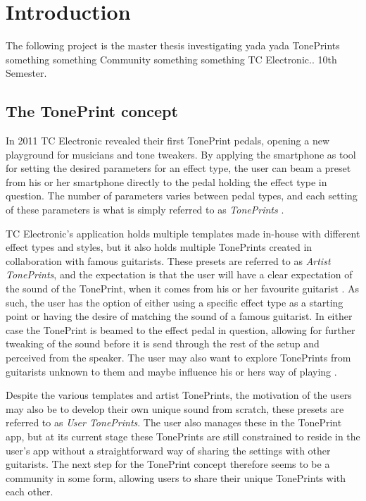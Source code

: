\chapter{Introduction}
\label{Introduction}
The following project is the master thesis investigating yada yada TonePrints something something Community something something TC Electronic.. 10th Semester.

\section{The TonePrint concept}
\label{TonePrints}
In 2011 TC Electronic revealed their first TonePrint pedals, opening a new playground for musicians and tone tweakers. By applying the smartphone as tool for setting the desired parameters for an effect type, the user can beam a preset from his or her smartphone directly to the pedal holding the effect type in question. The number of parameters varies between pedal types, and each setting of these parameters is what is simply referred to as \textit{TonePrints} \parencite{WEB:AboutTonePrints}.

TC Electronic's application holds multiple templates made in-house with different effect types and styles, but it also holds multiple TonePrints created in collaboration with famous guitarists. These presets are referred to as \textit{Artist TonePrints}, and the expectation is that the user will have a clear expectation of the sound of the TonePrint, when it comes from his or her favourite guitarist \parencite[][8]{PDF:TonePrintAnalyse}. As such, the user has the option of either using a specific effect type as a starting point or having the desire of matching the sound of a famous guitarist. In either case the TonePrint is beamed to the effect pedal in question, allowing for further tweaking of the sound before it is send through the rest of the setup and perceived from the speaker. The user may also want to explore TonePrints from guitarists unknown to them and maybe influence his or hers way of playing \parencite[][8]{PDF:TonePrintAnalyse}.

Despite the various templates and artist TonePrints, the motivation of the users may also be to develop their own unique sound from scratch, these presets are referred to as \textit{User TonePrints}. The user also manages these in the TonePrint app, but at its current stage these TonePrints are still constrained to reside in the user's app without a straightforward way of sharing the settings with other guitarists. The next step for the TonePrint concept therefore seems to be a community in some form, allowing users to share their unique TonePrints with each other.

